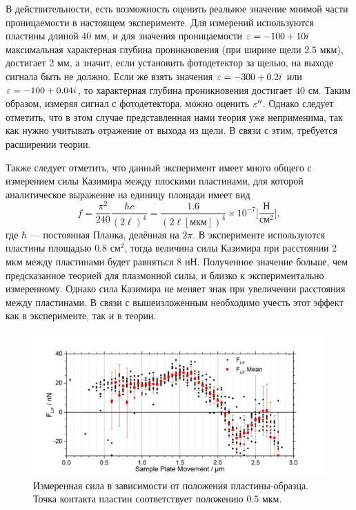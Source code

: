 В действительности, есть возможность оценить реальное значение мнимой части проницаемости в настоящем эксперименте. Для измерений используются пластины длиной $40$ мм, и для значения проницаемости $\varepsilon = -100 + 10i$ максимальная характерная глубина проникновения (при ширине щели  $2.5$ мкм),  достигает 2 мм, а значит, если установить фотодетектор за щелью, на выходе сигнала быть не должно. Если же взять значения $\varepsilon = -300 + 0.2i$ или $\varepsilon = -100+0.04i$, то характерная глубина проникновения достигает $40$ см. Таким образом, измеряя сигнал с фотодетектора, можно оценить $\varepsilon''$. Однако следует отметить, что в этом случае представленная нами теория уже неприменима, так как нужно учитывать отражение от выхода из щели. В связи с этим, требуется расширении теории. 

Также следует отметить, что данный эксперимент имеет много общего с измерением силы Казимира между плоскими пластинами, для которой аналитическое выражение на единицу площади имеет вид
\begin{equation}
  f = \frac{\pi^2}{240}\frac{\hbar c}{(2\ell)^4} = \frac{1.6}{(2\ell[\text{мкм}])^4}\times 10^{-7} \Big[\frac{\text{Н}}{\text{см}^2} \Big],
\end{equation}
где $\hbar$ --- постоянная Планка, делённая на $2\pi$. В эксперименте используются пластины площадью $0.8$ см$^2$, тогда величина силы Казимира при расстоянии $2$ мкм между пластинами будет равняться $8$ нН. Полученное значение больше, чем предсказанное теорией для плазмонной силы, и близко к экспериментально измеренному. Однако сила Казимира не меняет знак при увеличении расстояния между пластинами. В связи с вышеизложенным необходимо учесть этот эффект как в эксперименте, так и в теории.
\begin{figure}
    \centering
    \includegraphics[width=\textwidth]{figures/exp_data_force.png}
    \caption{Измеренная сила в зависимости от положения пластины-образца. Точка контакта пластин соответствует положению $0.5$ мкм.}
    \label{fig:force_exp}
\end{figure}
